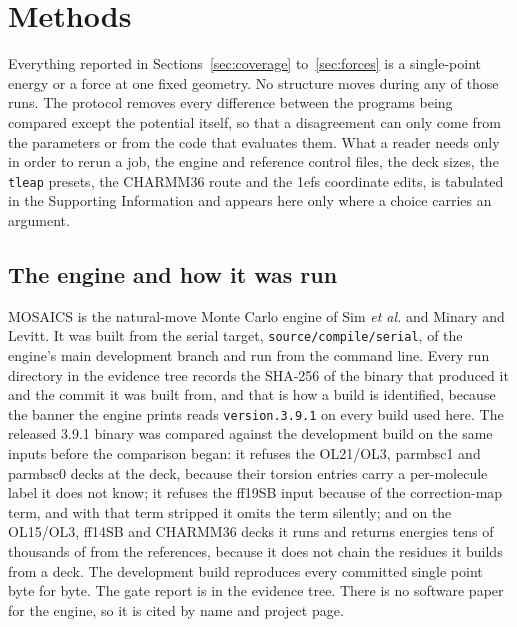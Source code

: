 \section{Methods}
\label{sec:methods}

Everything reported in Sections~\ref{sec:coverage} to~\ref{sec:forces} is a
single-point energy or a force at one fixed geometry. No structure moves during
any of those runs. The protocol removes every difference between the programs
being compared except the potential itself, so that a disagreement can only
come from the parameters or from the code that evaluates them. What a reader
needs only in order to rerun a job, the engine and reference control files,
the deck sizes, the \texttt{tleap} presets, the CHARMM36 route and the 1efs
coordinate edits, is tabulated in the Supporting Information and appears here
only where a choice carries an argument.

\subsection{The engine and how it was run}
\label{sec:methods-engine}

MOSAICS \cite{mosaics-software} is the natural-move Monte Carlo engine of Sim
\emph{et al.}\cite{sim2012naturalmoves} and Minary and
Levitt\cite{minary2010chainclosure}. It was built from the serial target,
\texttt{source/compile/serial}, of the engine's main development branch and
run from the command line. Every run directory in the evidence tree records the
SHA-256 of the binary that produced it and the commit it was built from, and
that is how a build is identified, because the banner the engine prints reads
\texttt{version.3.9.1} on every build used here. The released 3.9.1 binary was
compared against the development build on the same inputs before the
comparison began: it refuses the OL21/OL3, parmbsc1 and parmbsc0 decks at the
deck, because their torsion entries carry a per-molecule label it does not
know; it refuses the ff19SB input because of the correction-map term, and with
that term stripped it omits the term silently; and on the OL15/OL3, ff14SB and
CHARMM36 decks it runs and returns energies tens of thousands of \kcal{} from
the references, because it does not chain the residues it builds from a deck.
The development build reproduces every committed single point byte for byte.
The gate report is in the evidence tree. There is no software paper for the
engine, so it is cited by name and project page.

